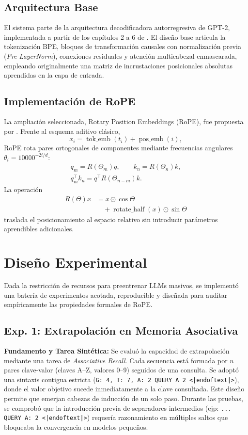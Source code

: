 \documentclass[11pt]{article}
\begin{document}
\subsection{Arquitectura Base}
El sistema parte de la arquitectura decodificadora
autorregresiva de GPT-2, implementada a partir de los
capítulos 2 a 6 de \citet{raschka2024}.
 El diseño base articula la tokenización BPE, bloques de transformación causales con normalización 
 previa (\textit{Pre-LayerNorm}), conexiones residuales y atención multicabezal enmascarada, 
 empleando originalmente una matriz de incrustaciones posicionales absolutas aprendidas en la
  capa de entrada. 

\subsection{Implementación de RoPE}
La ampliación seleccionada, Rotary Position Embeddings
(RoPE), fue propuesta por \citet{su2021roformer}.
Frente al esquema aditivo clásico,
\[
x_i = \operatorname{tok\_emb}(t_i) + \operatorname{pos\_emb}(i),
\]
RoPE rota pares ortogonales de componentes mediante frecuencias angulares $\theta_i = 10000^{-2i/d}$:
\begin{equation}
\begin{gathered}
q_m = R(\Theta_m)q,\qquad k_n = R(\Theta_n)k,\\
q_m^\top k_n = q^\top R(\Theta_{n-m})k.
\end{gathered}
\end{equation}
La operación
\[
\begin{aligned}
R(\Theta)x &= x \odot \cos\Theta\\
 &\quad + \operatorname{rotate\_half}(x) \odot \sin\Theta
\end{aligned}
\]
traslada el posicionamiento al espacio relativo sin introducir parámetros aprendibles adicionales.

\section{Diseño Experimental}
Dada la restricción de recursos para preentrenar LLMs masivos, se implementó una batería de experimentos acotada, reproducible y diseñada para auditar empíricamente las propiedades formales de RoPE.

\subsection{Exp. 1: Extrapolación en Memoria Asociativa}
\textbf{Fundamento y Tarea Sintética:} Se evaluó la capacidad de extrapolación mediante una tarea de \textit{Associative Recall}. Cada secuencia está formada por $n$ pares clave-valor (claves A--Z, valores 0--9) seguidos de una consulta. Se adoptó una sintaxis contigua estricta (\texttt{G: 4, T: 7, A: 2 QUERY A 2 <|endoftext|>}), donde el valor objetivo sucede inmediatamente a la clave consultada. Este diseño permite que emerjan cabezas de inducción de un solo paso. Durante las pruebas, se comprobó que la introducción previa de separadores intermedios (ejp: \texttt{... QUERY A: 2 <|endoftext|>}) requería razonamiento en múltiples saltos que bloqueaba la convergencia en modelos pequeños.
\end{document}
